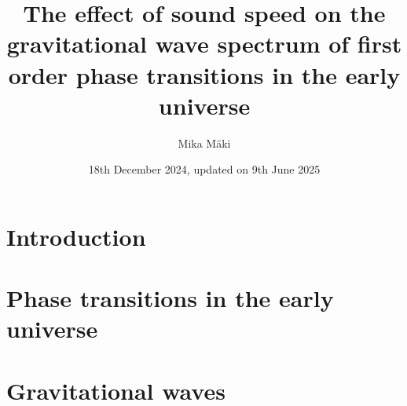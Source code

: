 \documentclass[english,twoside,openright]{UH_TCM_MSc}
\title{The effect of sound speed on the gravitational wave spectrum of first order phase transitions in the early universe}
\author{Mika Mäki}
\date{18th December 2024, updated on 9th June 2025}
\begin{document}
\maketitle


\begin{abstract}

\end{abstract}

\mytableofcontents

\mynomenclature

\clearpage
\listoffigures
\clearpage
\listoftables
\clearpage


% 

\chapter{Introduction}
\label{ch:introduction}


\chapter{Phase transitions in the early universe}
\label{ch:pt}







% 

\clearpage


\chapter{Gravitational waves}
\label{ch:gw}

\end{document}
